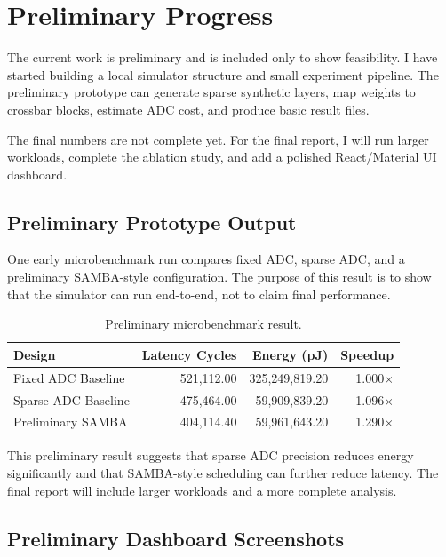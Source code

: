 \documentclass[11pt]{article}
\begin{document}
\section{Preliminary Progress}

The current work is preliminary and is included only to show feasibility. I have started building a local simulator structure and small experiment pipeline. The preliminary prototype can generate sparse synthetic layers, map weights to crossbar blocks, estimate ADC cost, and produce basic result files.

The final numbers are not complete yet. For the final report, I will run larger workloads, complete the ablation study, and add a polished React/Material UI dashboard.

\subsection{Preliminary Prototype Output}

One early microbenchmark run compares fixed ADC, sparse ADC, and a preliminary SAMBA-style configuration. The purpose of this result is to show that the simulator can run end-to-end, not to claim final performance.

\begin{table}[H]
\centering
\caption{Preliminary microbenchmark result.}
\begin{tabular}{lrrr}
\toprule
\textbf{Design} & \textbf{Latency Cycles} & \textbf{Energy (pJ)} & \textbf{Speedup} \\
\midrule
Fixed ADC Baseline & 521,112.00 & 325,249,819.20 & 1.000$\times$ \\
Sparse ADC Baseline & 475,464.00 & 59,909,839.20 & 1.096$\times$ \\
Preliminary SAMBA & 404,114.40 & 59,961,643.20 & 1.290$\times$ \\
\bottomrule
\end{tabular}
\end{table}

This preliminary result suggests that sparse ADC precision reduces energy significantly and that SAMBA-style scheduling can further reduce latency. The final report will include larger workloads and a more complete analysis.

\subsection{Preliminary Dashboard Screenshots}
\end{document}
